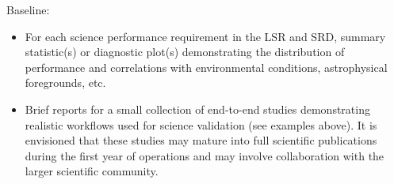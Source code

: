 Baseline:

\begin{itemize}
\item For each science performance requirement in the LSR and SRD, summary statistic(s) or diagnostic plot(s) demonstrating the distribution of performance and correlations with environmental conditions, astrophysical foregrounds, etc.
\item Brief reports for a small collection of end-to-end studies demonstrating realistic workflows used for science validation (see examples above). It is envisioned that these studies may mature into full scientific publications during the first year of operations and may involve collaboration with the larger scientific community.
\end{itemize}
